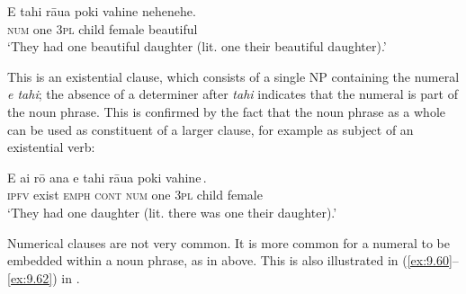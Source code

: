 \ea\label{ex:9.95}
\gll E tahi rāua poki vahine nehenehe. \\
\textsc{num} one \textsc{3pl} child female beautiful \\

\glt
‘They had one beautiful daughter (lit. one their beautiful daughter).’
\z

This is an existential clause, which consists of a single NP containing the numeral \textit{e tahi}; the absence of a determiner after \textit{tahi} indicates that the numeral is part of the noun phrase. This is confirmed by the fact that the noun phrase as a whole can be used as constituent of a larger clause, for example as subject of an existential verb:

\ea\label{ex:9.96}
\gll E ai rō {\ꞌ}ana {\ob}e tahi rāua poki vahine\,{\cb}. \\
\textsc{ipfv} exist \textsc{emph} \textsc{cont} {\db}\textsc{num} one \textsc{3pl} child female \\

\glt 
‘They had one daughter (lit. there was one their daughter).’ \textstyleExampleref{[R338.001 revised]} 
\z

Numerical clauses are not very common. It is more common for a numeral to be embedded within a noun phrase, as in  above. This is also illustrated in (\ref{ex:9.60}–\ref{ex:9.62}) in . 

